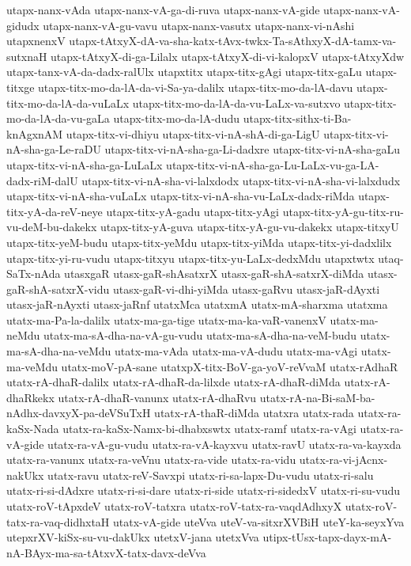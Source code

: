 {utapx-nanx-vAda
utapx-nanx-vA-ga-di-ruva
utapx-nanx-vA-gide
utapx-nanx-vA-gidudx
utapx-nanx-vA-gu-vavu
utapx-nanx-vasutx
utapx-nanx-vi-nAshi
utapxnenxV
utapx-tAtxyX-dA-va-sha-katx-tAvx-twkx-Ta-sAthxyX-dA-tamx-va-sutxnaH
utapx-tAtxyX-di-ga-Lilalx
utapx-tAtxyX-di-vi-kalopxV
utapx-tAtxyXdw
utapx-tanx-vA-da-dadx-ralUlx
utapxtitx
utapx-titx-gAgi
utapx-titx-gaLu
utapx-titxge
utapx-titx-mo-da-lA-da-vi-Sa-ya-dalilx
utapx-titx-mo-da-lA-davu
utapx-titx-mo-da-lA-da-vuLaLx
utapx-titx-mo-da-lA-da-vu-LaLx-va-sutxvo
utapx-titx-mo-da-lA-da-vu-gaLa
utapx-titx-mo-da-lA-dudu
utapx-titx-sithx-ti-Ba-knAgxnAM
utapx-titx-vi-dhiyu
utapx-titx-vi-nA-shA-di-ga-LigU
utapx-titx-vi-nA-sha-ga-Le-raDU
utapx-titx-vi-nA-sha-ga-Li-dadxre
utapx-titx-vi-nA-sha-gaLu
utapx-titx-vi-nA-sha-ga-LuLaLx
utapx-titx-vi-nA-sha-ga-Lu-LaLx-vu-ga-LA-dadx-riM-dalU
utapx-titx-vi-nA-sha-vi-lalxdodx
utapx-titx-vi-nA-sha-vi-lalxdudx
utapx-titx-vi-nA-sha-vuLaLx
utapx-titx-vi-nA-sha-vu-LaLx-dadx-riMda
utapx-titx-yA-da-reV-neye
utapx-titx-yA-gadu
utapx-titx-yAgi
utapx-titx-yA-gu-titx-ru-vu-deM-bu-dakekx
utapx-titx-yA-guva
utapx-titx-yA-gu-vu-dakekx
utapx-titxyU
utapx-titx-yeM-budu
utapx-titx-yeMdu
utapx-titx-yiMda
utapx-titx-yi-dadxlilx
utapx-titx-yi-ru-vudu
utapx-titxyu
utapx-titx-yu-LaLx-dedxMdu
utapxtwtx
utaq-SaTx-nAda
utasxgaR
utasx-gaR-shAsatxrX
utasx-gaR-shA-satxrX-diMda
utasx-gaR-shA-satxrX-vidu
utasx-gaR-vi-dhi-yiMda
utasx-gaRvu
utasx-jaR-dAyxti
utasx-jaR-nAyxti
utasx-jaRnf
utatxMca
utatxmA
utatx-mA-sharxma
utatxma
utatx-ma-Pa-la-dalilx
utatx-ma-ga-tige
utatx-ma-ka-vaR-vanenxV
utatx-ma-neMdu
utatx-ma-sA-dha-na-vA-gu-vudu
utatx-ma-sA-dha-na-veM-budu
utatx-ma-sA-dha-na-veMdu
utatx-ma-vAda
utatx-ma-vA-dudu
utatx-ma-vAgi
utatx-ma-veMdu
utatx-moV-pA-sane
utatxpX-titx-BoV-ga-yoV-reVvaM
utatx-rAdhaR
utatx-rA-dhaR-dalilx
utatx-rA-dhaR-da-lilxde
utatx-rA-dhaR-diMda
utatx-rA-dhaRkekx
utatx-rA-dhaR-vanunx
utatx-rA-dhaRvu
utatx-rA-na-Bi-saM-ba-nAdhx-davxyX-pa-deVSuTxH
utatx-rA-thaR-diMda
utatxra
utatx-rada
utatx-ra-kaSx-Nada
utatx-ra-kaSx-Namx-bi-dhabxswtx
utatx-ramf
utatx-ra-vAgi
utatx-ra-vA-gide
utatx-ra-vA-gu-vudu
utatx-ra-vA-kayxvu
utatx-ravU
utatx-ra-va-kayxda
utatx-ra-vanunx
utatx-ra-veVnu
utatx-ra-vide
utatx-ra-vidu
utatx-ra-vi-jAcnx-nakUkx
utatx-ravu
utatx-reV-Savxpi
utatx-ri-sa-lapx-Du-vudu
utatx-ri-salu
utatx-ri-si-dAdxre
utatx-ri-si-dare
utatx-ri-side
utatx-ri-sidedxV
utatx-ri-su-vudu
utatx-roV-tApxdeV
utatx-roV-tatxra
utatx-roV-tatx-ra-vaqdAdhxyX
utatx-roV-tatx-ra-vaq-didhxtaH
utatx-vA-gide
uteVva
uteV-va-sitxrXVBiH
uteY-ka-seyxYva
utepxrXV-kiSx-su-vu-dakUkx
utetxV-jana
utetxVva
utipx-tUsx-tapx-dayx-mA-nA-BAyx-ma-sa-tAtxvX-tatx-davx-deVva
}
